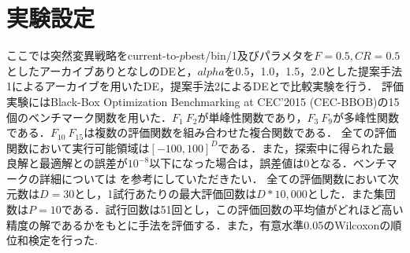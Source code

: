 \documentclass[a4paper,11pt,oneside,openany]{jsbook}
\begin{document}
\section{実験設定}
ここでは突然変異戦略をcurrent-to-$p$best/bin/1及びパラメタを$F=0.5,CR=0.5$としたアーカイブありとなしのDEと，$alpha$を0.5，1.0，1.5，2.0とした提案手法1によるアーカイブを用いたDE，提案手法2によるDEとで比較実験を行う．
評価実験にはBlack-Box Optimization Benchmarking at CEC'2015 (CEC-BBOB)の15個のベンチマーク関数を用いた．$F_{1}~F_{2}$が単峰性関数であり，$F_3~F_9$が多峰性関数である．$F_{10}~F_{15}$は複数の評価関数を組み合わせた複合関数である．
全ての評価関数において実行可能領域は$[-100,100]^D$である．また，探索中に得られた最良解と最適解との誤差が$10^{-8}$以下になった場合は，誤差値は0となる．ベンチマークの詳細については \cite{CEC2015} を参考にしていただきたい．
全ての評価関数において次元数は$D=30$とし，1試行あたりの最大評価回数は$D*10,000$とした．また集団数は$P=10$である．試行回数は51回とし，この評価回数の平均値がどれほど高い精度の解であるかをもとに手法を評価する．また，有意水準0.05のWilcoxonの順位和検定を行った.
\end{document}
